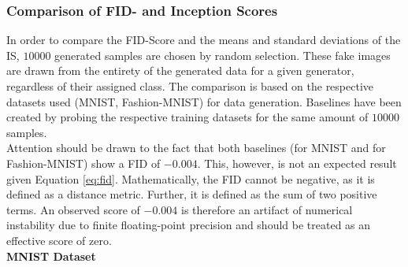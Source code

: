 \subsubsection[Question 1]{Comparison of FID- and Inception Scores}     \label{exp_results_ans_q1}
In order to compare the FID-Score and the means and standard deviations of the IS, $10 000$ generated samples are chosen by random selection. These fake images are drawn from the entirety of the generated data for a given generator, regardless of their assigned class. The comparison is based on the respective datasets used (MNIST, Fashion-MNIST) for data generation. Baselines have been created by probing the respective training datasets for the same amount of $10	000$ samples.\\
Attention should be drawn to the fact that both baselines (for MNIST and for Fashion-MNIST) show a FID of $-0.004$. This, however, is not an expected result given Equation \ref{eq:fid}. Mathematically, the FID cannot be negative, as it is defined as a distance metric. Further, it is defined as the sum of two positive terms. An observed score of $-0.004$ is therefore an artifact of numerical instability due to finite floating-point precision and should be treated as an effective score of zero.
\\
\noindent\textbf{MNIST Dataset}\label{exp_ans_q1_mnsit_fid_is}
